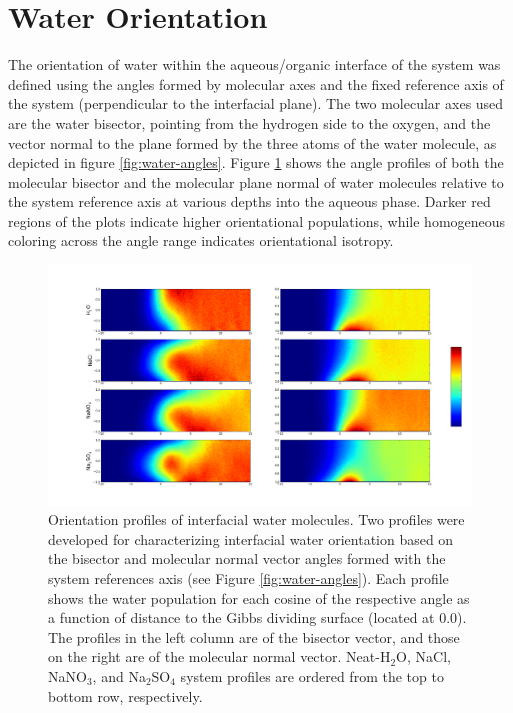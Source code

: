 \section{Water Orientation}
The orientation of water within the aqueous/organic interface of the system was defined using the angles formed by molecular axes and the fixed reference axis of the system (perpendicular to the interfacial plane). The two molecular axes used are the water bisector, pointing from the hydrogen side to the oxygen, and the vector normal to the plane formed by the three atoms of the water molecule, as depicted in figure \ref{fig:water-angles}. Figure \ref{fig:2dhisto} shows the angle profiles of both the molecular bisector and the molecular plane normal of water molecules relative to the system reference axis at various depths into the aqueous phase. Darker red regions of the plots indicate higher orientational populations, while homogeneous coloring across the angle range indicates orientational isotropy.


\begin{figure}[h!]
\begin{center}
	\includegraphics[scale=0.26]{images/h2o-2dhistograms.png}
	\caption{Orientation profiles of interfacial water molecules. Two profiles were developed for characterizing interfacial water orientation based on the bisector and molecular normal vector angles formed with the system references axis (see Figure \ref{fig:water-angles}). Each profile shows the water population for each cosine of the respective angle as a function of distance to the Gibbs dividing surface (located at 0.0). The profiles in the left column are of the bisector vector, and those on the right are of the molecular normal vector. Neat-H$_2$O, NaCl, NaNO$_3$, and Na$_2$SO$_4$ system profiles are ordered from the top to bottom row, respectively.}
	\label{fig:2dhisto}
\end{center}
\end{figure}

